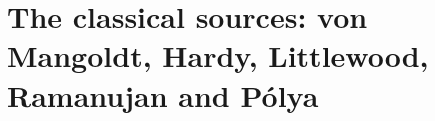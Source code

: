 \chapter{The classical sources: von Mangoldt, Hardy, Littlewood, Ramanujan and P\'olya}\label{vol3:ch10}

